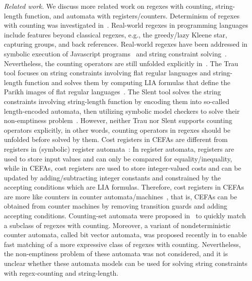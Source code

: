 \medskip
\noindent
\emph{Related work.} 
We discuss more related work on regexes with counting, string-length function, and automata with registers/counters.  
%
Determinism of regexes with counting was investigated in~\cite{GGM12,CL15}. 
%
Real-world regexes in programming languages include features beyond classical regexes, e.g., the greedy/lazy Kleene star, capturing groups, and back references. Real-world regexes have been addressed in symbolic execution of Javascript programs~\cite{LMK19} and string constraint solving~\cite{CF+22}. 
Nevertheless, the counting operators are still unfolded explicitly in~\cite{CF+22}. 
%
The Trau tool focuses on string constraints involving flat regular languages and string-length function and solves them by computing LIA formulas that define the Parikh images of flat regular languages~\cite{z3trau}. The Slent tool solves the string constraints involving string-length function by encoding them into so-called length-encoded automata, then utilizing symbolic model checkers to solve their non-emptiness problem~\cite{WC+18}. However, neither Trau nor Slent supports counting operators explicitly, in other words, counting operators in regexes should be unfolded before solved by them.
%
Cost registers in CEFAs are different from registers in (symbolic) register automata~\cite{ra,sra}:  In register automata, registers are used to store input values and can only be compared for equality/inequality, while in CEFAs, cost registers are used to store integer-valued costs and can be updated by adding/subtracting integer constants and constrained by the accepting conditions which are LIA formulas.
%
Therefore, cost registers in CEFAs are more like counters in counter automata/machines~\cite{Minsky67}, that is, CEFAs can be obtained from counter machines by removing transition guards and adding accepting conditions. 
%
%
Counting-set automata were proposed in~\cite{redos_lenka,HS+23} to quickly match a subclass of regexes with counting. Moreover, a variant of nondeterministic counter automata, called bit vector automata, was proposed recently in \cite{GKM23} to enable fast matching of a more expressive class of regexes with counting.   Nevertheless, the non-emptiness problem of these automata was not considered, and it is unclear whether these automata models can be used for solving string constraints with regex-counting and string-length. 

